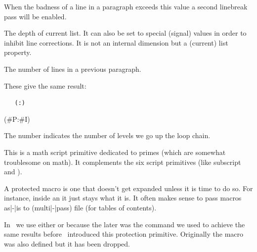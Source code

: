 \startoldprimitive[title={\prm {pretolerance}}]

When the badness of a line in a paragraph exceeds this value a second linebreak
pass will be enabled.

\stopoldprimitive

\startoldprimitive[title={\prm {prevdepth}}]

The depth of current list. It can also be set to special (signal) values in order
to inhibit line corrections. It is not an internal dimension but a (current) list
property.

\stopoldprimitive

\startoldprimitive[title={\prm {prevgraf}}]

The number of lines in a previous paragraph.

\stopoldprimitive

\startnewprimitive[title={\prm {previousloopiterator}}]

\startbuffer
\edef\testA{
    \expandedrepeat 2 {%
        \expandedrepeat 3 {%
            (\the\previousloopiterator1:\the\currentloopiterator)
        }%
    }%
}
\edef\testB{
    \expandedrepeat 2 {%
        \expandedrepeat 3 {%
            (#P:#I) %
        }%
    }%
}
\stopbuffer

\typebuffer \getbuffer

These give the same result:

\startlines \tt
\meaningasis\testA
\meaningasis\testB
\stoplines

The number indicates the number of levels we go up the loop chain.

\stopnewprimitive

\startnewprimitive[title={\prm {primescript}}]

This is a math script primitive dedicated to primes (which are somewhat
troublesome on math). It complements the six script primitives (like \prm
{subscript} and ).

\stopnewprimitive

\startoldprimitive[title={\prm {protected}}]

A protected macro is one that doesn't get expanded unless it is time to do so.
For instance, inside an  it just stays what it is. It often makes
sense to pass macros as|-|is to (multi|-|pass) file (for tables of contents).

In \CONTEXT\ we use either  or  because the
later was the command we used to achieve the same results before \ETEX\
introduced this protection primitive. Originally the  macro was
also defined but it has been dropped.

